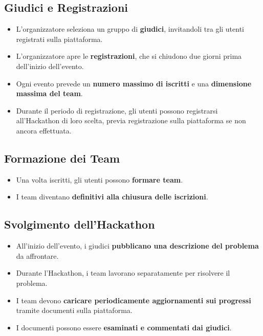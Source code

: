 \documentclass[a4paper, 11pt]{article}
\begin{document}
	\subsection*{Giudici e Registrazioni}
	
	\begin{itemize}
		\item L'organizzatore seleziona un gruppo di \textbf{giudici}, invitandoli tra gli utenti registrati sulla piattaforma.
		\item L'organizzatore apre le \textbf{registrazioni}, che si chiudono due giorni prima dell'inizio dell'evento.
		\item Ogni evento prevede un \textbf{numero massimo di iscritti} e una \textbf{dimensione massima del team}.
		\item Durante il periodo di registrazione, gli utenti possono registrarsi all'Hackathon di loro scelta, previa registrazione sulla piattaforma se non ancora effettuata.
	\end{itemize}
	
	\subsection*{Formazione dei Team}
	
	\begin{itemize}
		\item Una volta iscritti, gli utenti possono \textbf{formare team}.
		\item I team diventano \textbf{definitivi alla chiusura delle iscrizioni}.
	\end{itemize}
	
	\subsection*{Svolgimento dell'Hackathon}
	
	\begin{itemize}
		\item All'inizio dell'evento, i giudici \textbf{pubblicano una descrizione del problema} da affrontare.
		\item Durante l’Hackathon, i team lavorano separatamente per risolvere il problema.
		\item I team devono \textbf{caricare periodicamente aggiornamenti sui progressi} tramite documenti sulla piattaforma.
		\item I documenti possono essere \textbf{esaminati e commentati dai giudici}.
	\end{itemize}
	
\end{document}
